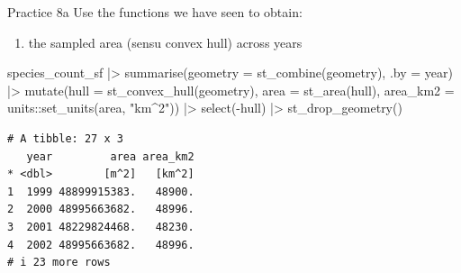 \documentclass[
  ignorenonframetext,
  aspectratio=169,
  t]{beamer}
\newenvironment{Shaded}{\begin{snugshade}}{\end{snugshade}}
\newcommand{\AttributeTok}[1]{\textcolor[rgb]{0.40,0.45,0.13}{#1}}
\newcommand{\FunctionTok}[1]{\textcolor[rgb]{0.28,0.35,0.67}{#1}}
\newcommand{\NormalTok}[1]{\textcolor[rgb]{0.00,0.23,0.31}{#1}}
\newcommand{\SpecialCharTok}[1]{\textcolor[rgb]{0.37,0.37,0.37}{#1}}
\newcommand{\StringTok}[1]{\textcolor[rgb]{0.13,0.47,0.30}{#1}}
\providecommand{\tightlist}{%
  \setlength{\itemsep}{0pt}\setlength{\parskip}{0pt}}
\begin{document}
\begin{frame}[fragile]{Practice 8a}
\protect{}\label{practice-8a}
Use the functions we have seen to obtain:

\begin{enumerate}
\tightlist
\item
  the sampled area (sensu convex hull) across years
\end{enumerate}

\footnotesize

\begin{Shaded}
\begin{Highlighting}[]
\NormalTok{species\_count\_sf }\SpecialCharTok{|\textgreater{}} 
    \FunctionTok{summarise}\NormalTok{(}\AttributeTok{geometry =} \FunctionTok{st\_combine}\NormalTok{(geometry), }\AttributeTok{.by =}\NormalTok{ year) }\SpecialCharTok{|\textgreater{}} 
    \FunctionTok{mutate}\NormalTok{(}\AttributeTok{hull =} \FunctionTok{st\_convex\_hull}\NormalTok{(geometry),}
           \AttributeTok{area =} \FunctionTok{st\_area}\NormalTok{(hull),}
           \AttributeTok{area\_km2 =}\NormalTok{ units}\SpecialCharTok{::}\FunctionTok{set\_units}\NormalTok{(area, }\StringTok{"km\^{}2"}\NormalTok{)) }\SpecialCharTok{|\textgreater{}} 
    \FunctionTok{select}\NormalTok{(}\SpecialCharTok{{-}}\NormalTok{hull) }\SpecialCharTok{|\textgreater{}} 
    \FunctionTok{st\_drop\_geometry}\NormalTok{()}
\end{Highlighting}
\end{Shaded}

\begin{verbatim}
# A tibble: 27 x 3
   year         area area_km2
* <dbl>        [m^2]   [km^2]
1  1999 48899915383.   48900.
2  2000 48995663682.   48996.
3  2001 48229824468.   48230.
4  2002 48995663682.   48996.
# i 23 more rows
\end{verbatim}

\normalsize
\end{frame}
\end{document}
